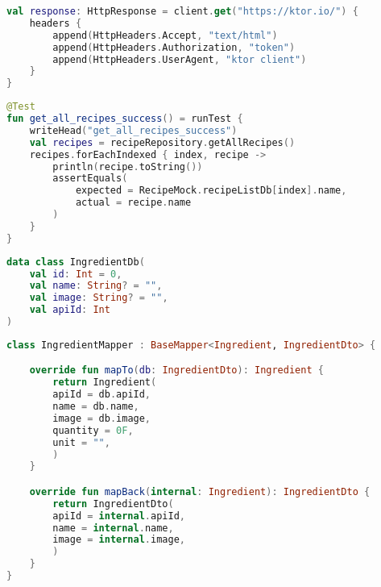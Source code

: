 \begin{lstlisting}[caption={Ktor Header},label={lst:ktor_header}, language=kotlin]
val response: HttpResponse = client.get("https://ktor.io/") {
    headers {
        append(HttpHeaders.Accept, "text/html")
        append(HttpHeaders.Authorization, "token")
        append(HttpHeaders.UserAgent, "ktor client")
    }
}
\end{lstlisting}

\begin{lstlisting}[caption={Test},label={lst:test}, language=kotlin]
@Test
fun get_all_recipes_success() = runTest {
    writeHead("get_all_recipes_success")
    val recipes = recipeRepository.getAllRecipes()
    recipes.forEachIndexed { index, recipe ->
        println(recipe.toString())
        assertEquals(
            expected = RecipeMock.recipeListDb[index].name,
            actual = recipe.name
        )
    }
}
\end{lstlisting}

\begin{lstlisting}[caption={Buisnessmodel},label={lst:buisnessmodel}, language=kotlin]
data class IngredientDb(
    val id: Int = 0,
    val name: String? = "",
    val image: String? = "",
    val apiId: Int
)
\end{lstlisting}

\begin{lstlisting}[caption={Mapper},label={lst:mapper}, language=kotlin]
class IngredientMapper : BaseMapper<Ingredient, IngredientDto> {

    override fun mapTo(db: IngredientDto): Ingredient {
        return Ingredient(
        apiId = db.apiId,
        name = db.name,
        image = db.image,
        quantity = 0F,
        unit = "",
        )
    }

    override fun mapBack(internal: Ingredient): IngredientDto {
        return IngredientDto(
        apiId = internal.apiId,
        name = internal.name,
        image = internal.image,
        )
    }
}
    \end{lstlisting}
